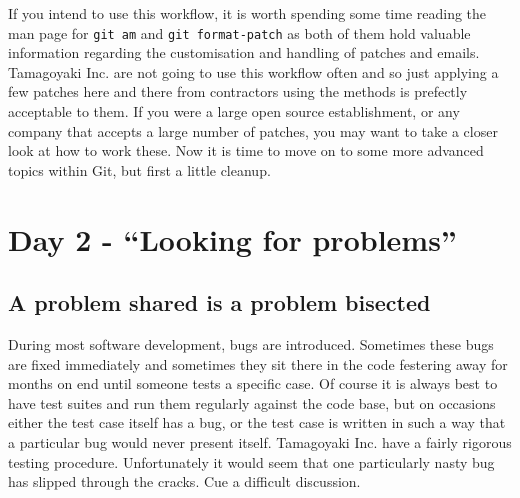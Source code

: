 If you intend to use this workflow, it is worth spending some time reading the man page for \texttt{git am} and \texttt{git format-patch} as both of them hold valuable information regarding the customisation and handling of patches and emails.
Tamagoyaki Inc. are not going to use this workflow often and so just applying a few patches here and there from contractors using the methods is prefectly acceptable to them.
If you were a large open source establishment, or any company that accepts a large number of patches, you may want to take a closer look at how to work these.
Now it is time to move on to some more advanced topics within Git, but first a little cleanup.


\section{Day 2 - ``Looking for problems''}
\subsection{A problem shared is a problem bisected}

During most software development, bugs are introduced.
Sometimes these bugs are fixed immediately and sometimes they sit there in the code festering away for months on end until someone tests a specific case.
Of course it is always best to have test suites and run them regularly against the code base, but on occasions either the test case itself has a bug,
or the test case is written in such a way that a particular bug would never present itself.
Tamagoyaki Inc. have a fairly rigorous testing procedure.
Unfortunately it would seem that one particularly nasty bug has slipped through the cracks.
Cue a difficult discussion.

